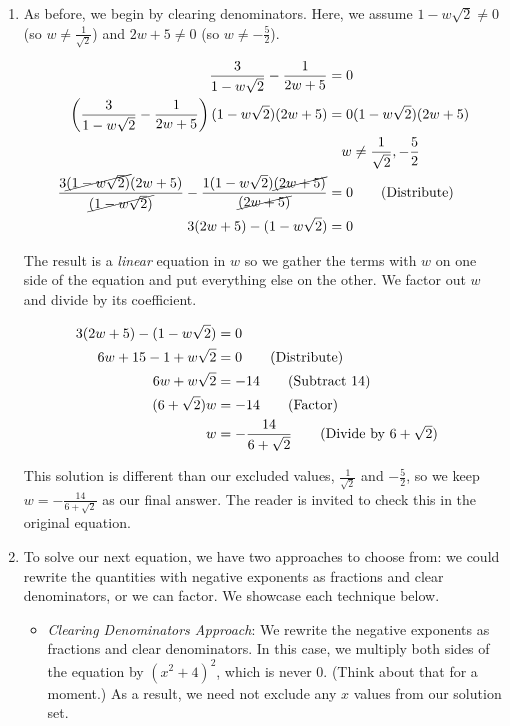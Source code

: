\begin{ex}
\begin{enumerate}
\item  As before, we begin by clearing denominators.  Here, we assume $1 - w\sqrt{2} \neq 0$ (so $w \neq \frac{1}{\sqrt{2}}$) and $2w+5 \neq 0$ (so $w \neq -\frac{5}{2}$).

\begin{align*}
\dfrac{3}{1 - w\sqrt{2}} - \dfrac{1}{2w+5} & =  0 \\
\left(\dfrac{3}{1 - w\sqrt{2}} - \dfrac{1}{2w+5}\right)(1 - w\sqrt{2})(2w+5) & =  0 (1 - w\sqrt{2})(2w+5) \\
&{} \quad w \neq \dfrac{1}{\sqrt{2}}, -\dfrac{5}{2} \\ 
\dfrac{3\cancel{(1 - w\sqrt{2})}(2w+5) }{\cancel{(1 - w\sqrt{2})}}- \dfrac{1(1 - w\sqrt{2})\cancel{(2w+5)}}{\cancel{(2w+5)}} & = 0 \tag{Distribute} \\ 
3(2w+5) - (1-w\sqrt{2}) & = 0 \\
\end{align*}

The result is a \textit{linear} equation in $w$ so we gather the terms with $w$ on one side of the equation and put everything else on the other.  We factor out $w$ and divide by its coefficient.

\begin{align*}
3(2w+5) - (1-w\sqrt{2}) & = 0 & \\
6w + 15 - 1 + w\sqrt{2} & = 0 \tag{Distribute} \\
6w + w\sqrt{2} & = -14 \tag{Subtract $14$} \\
(6 + \sqrt{2})w & = -14 \tag{Factor} \\
w & = -\dfrac{14}{6 + \sqrt{2}} \tag{Divide by $6 + \sqrt{2}$} \\ 
\end{align*}

This solution is different than our excluded values, $\frac{1}{\sqrt{2}}$ and $-\frac{5}{2}$, so we keep $w = -\frac{14}{6 + \sqrt{2}}$ as our final answer.  The reader is invited to check this in the original equation.

\item  To solve our next equation, we have two approaches to choose from:  we could rewrite the quantities with negative exponents as fractions and clear denominators, or we can factor.  We showcase each technique below.

\begin{itemize}

\item \textit{Clearing Denominators Approach}:  We rewrite the negative exponents as fractions and clear denominators.  In this case, we multiply both sides of the equation by $(x^2+4)^2$, which is never $0$. (Think about that for a moment.)  As a result, we need not exclude any $x$ values from our solution set.


\end{itemize}
\end{enumerate}
\end{ex}
